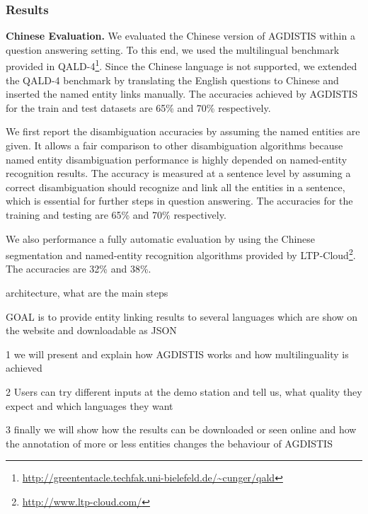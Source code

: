 \subsubsection{Results}



\noindent \textbf{Chinese Evaluation.} We evaluated the Chinese version of AGDISTIS within a question answering setting. 
To this end, we used the multilingual benchmark provided in QALD-4\footnote{\url{http://greententacle.techfak.uni-bielefeld.de/~cunger/qald}}. 
Since the Chinese language is not supported, we extended the QALD-4 benchmark by translating the English questions to Chinese and inserted the named entity links manually.
The accuracies achieved by AGDISTIS for the train and test datasets are 65\% and 70\% respectively. 



We first report the disambiguation accuracies by assuming the named entities are given. It allows a fair comparison to other disambiguation algorithms because named entity disambiguation performance is highly depended on named-entity recognition results. The accuracy is measured at a sentence level by assuming a correct disambiguation should recognize and link all the entities in a sentence, which is essential for further steps in question answering. The accuracies for the training and testing are 65\% and 70\% respectively. 

We also performance a fully automatic evaluation by using the Chinese segmentation and named-entity recognition algorithms provided by LTP-Cloud\footnote{\url{http://www.ltp-cloud.com/}}. 
The accuracies are 32\% and 38\%.

architecture, what are the main steps

GOAL is to provide entity linking results to several languages which are show on the website and downloadable as JSON

1 we will present and explain how AGDISTIS works and how multilinguality is achieved

2 Users can try different inputs at the demo station and tell us, what quality they expect and which languages they want

3 finally we will show how the results can be downloaded or seen online and how the annotation of more or less entities changes the behaviour of AGDISTIS


